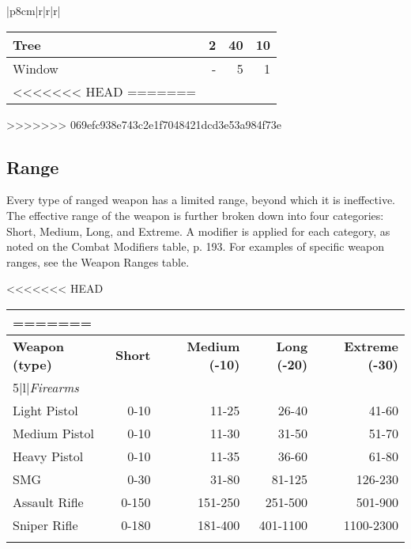 \begin{table}
\begin{tabular}{|p{8cm}|r|r|r|}
\begin{table}
\begin{tabularx}{\hline}{|X|r|r|r|}
Tree	&2	&40	&10	\\ \hline

Window	&-	&5	&1	\\ \hline

<<<<<<< HEAD \label{tab:sample-objects-structures} ======= \end{tabularx} >>>>>>> 069efc938e743c2e1f7048421dcd3e53a984f73e \label{tab:sample-objects-structures} \end{table} 

\subsection{Range} \label{sec:range} 

Every type of ranged weapon has a limited range, beyond which it is ineffective. The effective range of the weapon is further broken down into four categories: Short, Medium, Long, and Extreme. A modifier is applied for each category, as noted on the Combat Modifiers table, p. 193. For examples of specific weapon ranges, see the Weapon Ranges table. 

\begin{table} <<<<<<< HEAD \begin{tabular}{|l|r|r|r|r|} ======= \begin{tabularx}{\hline}{|X|r|r|r|r|} >>>>>>> 069efc938e743c2e1f7048421dcd3e53a984f73e \hline

\hline{5}{|c|}{\textbf{Weapon ranges}} \\ \hline

\textbf{Weapon (type)} &\textbf{Short} &\textbf{Medium (-10)} &\textbf{Long (-20)} &\textbf{Extreme (-30)}\\ \hline

\hline{5}{|l|}{\emph{Firearms}} \\ \hline

Light Pistol	&0-10	&11-25	&26-40	&41-60	\\ \hline

Medium Pistol	&0-10	&11-30	&31-50	&51-70	\\ \hline

Heavy Pistol	&0-10	&11-35	&36-60	&61-80	\\ \hline

SMG	&0-30	&31-80	&81-125	&126-230	\\ \hline

Assault Rifle	&0-150	&151-250	&251-500	&501-900	\\ \hline

Sniper Rifle	&0-180	&181-400	&401-1100	&1100-2300	\\ \hline


\end{tabularx}
\end{tabular}
\end{table}
\end{tabular}
\end{table}
